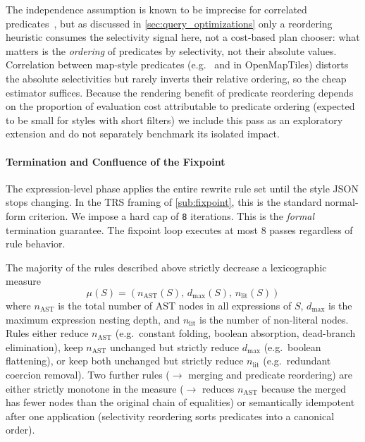 \noindent The independence assumption is known to be imprecise for correlated predicates~\cite{selingerAccessPathSelection1979}, but as discussed in \cref{sec:query_optimizations} only a reordering heuristic consumes the selectivity signal here, not a cost-based plan chooser: what matters is the \emph{ordering} of predicates by selectivity, not their absolute values.
Correlation between map-style predicates (e.g.\ \texttt{} and \texttt{} in OpenMapTiles) distorts the absolute selectivities but rarely inverts their relative ordering, so the cheap estimator suffices.
Because the rendering benefit of predicate reordering depends on the proportion of evaluation cost attributable to predicate ordering (expected to be small for styles with short filters) we include this pass as an exploratory extension and do not separately benchmark its isolated impact.

\paragraph{Termination and Confluence of the Fixpoint}
The expression-level phase applies the entire rewrite rule set until the style \ac{JSON} stops changing.
In the \ac{TRS} framing of \cref{sub:fixpoint}, this is the standard normal-form criterion.
We impose a hard cap of \texttt{8} iterations.
This is the \emph{formal} termination guarantee.
The fixpoint loop executes at most 8 passes regardless of rule behavior.

The majority of the rules described above strictly decrease a lexicographic measure
\begin{equation}\label{eq:termination_measure}
    \mu(S) = (n_{\mathrm{AST}}(S),\, d_{\max}(S),\, n_{\mathrm{lit}}(S))
\end{equation}
where $n_{\mathrm{AST}}$ is the total number of \ac{AST} nodes in all expressions of $S$, $d_{\max}$ is the maximum expression nesting depth, and $n_{\mathrm{lit}}$ is the number of non-literal nodes.
Rules either reduce $n_{\mathrm{AST}}$ (e.g.\ constant folding, boolean absorption, dead-branch elimination), keep $n_{\mathrm{AST}}$ unchanged but strictly reduce $d_{\max}$ (e.g.\ boolean flattening), or keep both unchanged but strictly reduce $n_{\mathrm{lit}}$ (e.g.\ redundant coercion removal).
Two further rules ($\to$ merging and predicate reordering) are either strictly monotone in the measure ($\to$ reduces $n_{\mathrm{AST}}$ because the merged  has fewer nodes than the original chain of equalities) or semantically idempotent after one application (selectivity reordering sorts predicates into a canonical order).

